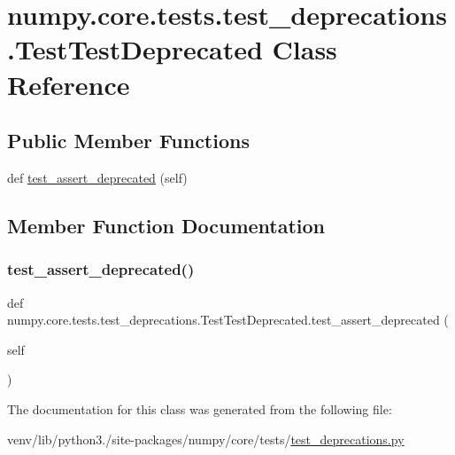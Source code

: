 \hypertarget{classnumpy_1_1core_1_1tests_1_1test__deprecations_1_1TestTestDeprecated}{}\section{numpy.\+core.\+tests.\+test\+\_\+deprecations.\+Test\+Test\+Deprecated Class Reference}
\label{classnumpy_1_1core_1_1tests_1_1test__deprecations_1_1TestTestDeprecated}
\subsection*{Public Member Functions}
\begin{DoxyCompactItemize}
\item 
def \hyperlink{classnumpy_1_1core_1_1tests_1_1test__deprecations_1_1TestTestDeprecated_a3231f9935283e388f2e9f07ca1344666}{test\+\_\+assert\+\_\+deprecated} (self)
\end{DoxyCompactItemize}


\subsection{Member Function Documentation}
\mbox{\label{classnumpy_1_1core_1_1tests_1_1test__deprecations_1_1TestTestDeprecated_a3231f9935283e388f2e9f07ca1344666}} 
\subsubsection{\texorpdfstring{test\+\_\+assert\+\_\+deprecated()}{test\_assert\_deprecated()}}
{\footnotesize\ttfamily def numpy.\+core.\+tests.\+test\+\_\+deprecations.\+Test\+Test\+Deprecated.\+test\+\_\+assert\+\_\+deprecated (\begin{DoxyParamCaption}\item[{}]{self }\end{DoxyParamCaption})}



The documentation for this class was generated from the following file\+:\begin{DoxyCompactItemize}
\item 
venv/lib/python3./site-\/packages/numpy/core/tests/\hyperlink{core_2tests_2test__deprecations_8py}{test\+\_\+deprecations.\+py}\end{DoxyCompactItemize}
